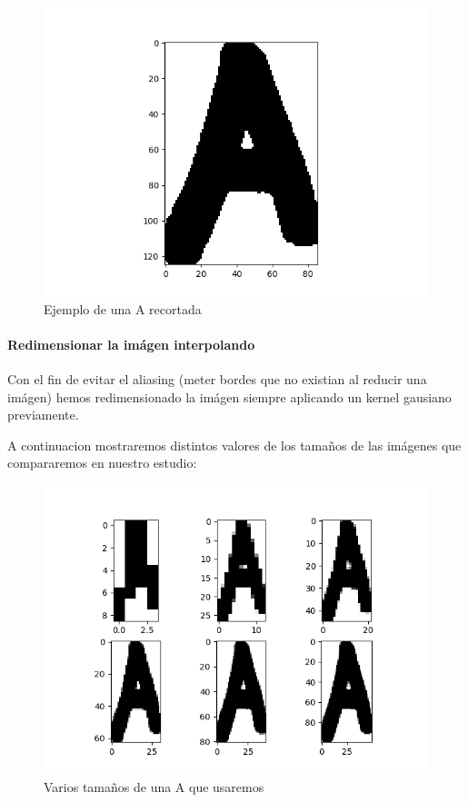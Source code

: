 \documentclass[8pt,a4paper]{article}
\begin{document}
\begin{figure}[htbp]
    \centering
    \includegraphics[scale=0.5]{./Arecortada.png}
    \caption{Ejemplo de una A recortada}
\end{figure}

\paragraph{Redimensionar la imágen interpolando}

Con el fin de evitar el aliasing (meter bordes que no existian al reducir una imágen) hemos redimensionado la imágen siempre aplicando un kernel gausiano previamente.

A continuacion mostraremos distintos valores de los tamaños de las imágenes que compararemos en nuestro estudio:

\begin{figure}[htbp]
   \centering
    \includegraphics[scale=0.5]{./A_Variando_Tam.png}
    \caption{Varios tamaños de una A que usaremos}
\end{figure}
\end{document}
